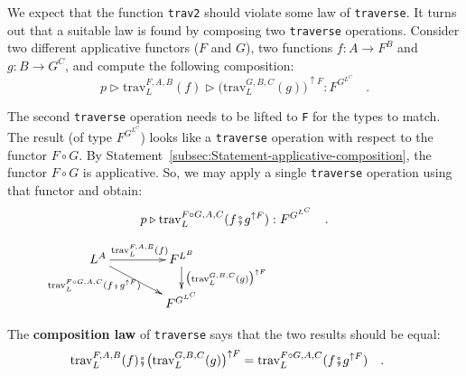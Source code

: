 We expect that the function \lstinline!trav2! should violate some
law of \lstinline!traverse!. It turns out that a suitable law is
found by composing two \lstinline!traverse! operations. Consider
two different applicative functors ($F$ and $G$), two functions
$f:A\rightarrow F^{B}$ and $g:B\rightarrow G^{C}$, and compute the
following composition:\vspace{-0.15\baselineskip}
\[
p\triangleright\text{trav}_{L}^{F,A,B}(f)\triangleright\big(\text{trav}_{L}^{G,B,C}(g)\big)^{\uparrow F}:F^{G^{L^{C}}}\quad.
\]
\vspace{-0.65\baselineskip}

\noindent The second \lstinline!traverse! operation needs to be lifted
to \lstinline!F! for the types to match. The result (of type $F^{G^{L^{C}}}$)
looks like a \lstinline!traverse! operation with respect to the functor
$F\circ G$. By Statement~\ref{subsec:Statement-applicative-composition},
the functor $F\circ G$ is applicative. So, we may apply a single
\lstinline!traverse! operation using that functor and obtain:\vspace{-0.5\baselineskip}
\[
p\triangleright\text{trav}_{L}^{F\circ G,A,C}(f\bef g^{\uparrow F}):F^{G^{L^{C}}}\quad.
\]

\begin{wrapfigure}{l}{0.38\columnwidth}%
\vspace{-1.6\baselineskip}
$\xymatrix{\xyScaleY{1.5pc}\xyScaleX{3.4pc}L^{A}\ar[dr]\sb(0.35){\text{trav}_{L}^{F\circ G,A,C}(f\bef g^{\uparrow F})~~}\ar[r]\sp(0.5){\text{trav}_{L}^{F,A,B}(f)} & F^{L^{B}}\ar[d]\sp(0.4){\big(\text{trav}_{L}^{G,B,C}(g)\big)^{\uparrow F}}\\
 & F^{G^{L^{C}}}
}
$\vspace{-1\baselineskip}
\end{wrapfigure}%

\noindent The \textbf{composition law}
of \lstinline!traverse! says that the two results should be equal:
\begin{equation}
\negthickspace\negthickspace\negthickspace\negthickspace\text{trav}_{L}^{F,A,B}(f)\bef\big(\text{trav}_{L}^{G,B,C}(g)\big)^{\uparrow F}=\text{trav}_{L}^{F\circ G,A,C}(f\bef g^{\uparrow F})\quad.\label{eq:composition-law-of-traverse}
\end{equation}

